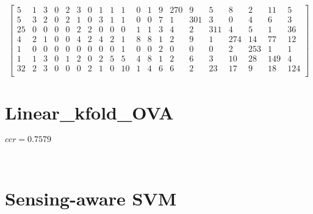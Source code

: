 \documentclass[a4paper, 11pt]{article}
\begin{document}
\[\begin{bmatrix}
     5  &   1  &   3  &   0   &  2  &   3 &    0  &   1  &   1  &   1  &   0 &    1  &   9  & 270  &   9  &   5  &   8  &   2  &  11  &   5 \\
     5  &   3  &   2  &   0   &  2  &   1 &    0  &   3  &   1  &   1  &   0 &    0  &   7  &   1  & 301  &   3  &   0  &   4  &   6  &   3 \\
    25  &   0  &   0  &   0   &  0  &   2 &    2  &   0  &   0  &   0  &   1 &    1  &   3  &   4  &   2  & 311  &   4  &   5  &   1  &  36 \\
     4  &   2  &   1  &   0   &  0  &   4 &    2  &   4  &   2  &   1  &   8 &    8  &   1  &   2  &   9  &   1  & 274  &  14  &  77  &  12 \\
     1  &   0  &   0  &   0   &  0  &   0 &    0  &   0  &   0  &   1  &   0 &    0  &   2  &   0  &   0  &   0  &   2  & 253  &   1  &   1 \\
     1  &   1  &   3  &   0   &  1  &   2 &    0  &   2  &   5  &   5  &   4 &    8  &   1  &   2  &   6  &   3  &  10  &  28  & 149  &   4 \\
    32  &   2  &   3  &   0   &  0  &   0 &    2  &   1  &   0  &  10  &   1 &    4  &   6  &   6  &   2  &  23  &  17  &   9  &  18  & 124 \\
\end{bmatrix}\]
\section{Linear_kfold_OVA}
$ccr=0.7579$

\
\section{Sensing-aware SVM}
\end{document}
